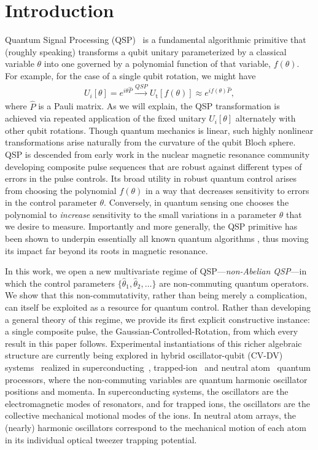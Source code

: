 \documentclass[aps,prx,showpacs,notitlepage,twocolumn,superscriptaddress,nofootinbib,preprintnumbers,floatfix,10pt, longbibliography]{revtex4-2}
\begin{document}
\section{Introduction}

Quantum Signal Processing (QSP)~\cite{low2017optimal,motlagh2023generalized} is a fundamental algorithmic primitive that (roughly speaking) transforms a qubit unitary parameterized by a classical variable $\theta$ into one governed by a polynomial function of that variable, $f(\theta)$.  For example, for the case of a single qubit rotation, we might have
\begin{align}
    U_i[\theta]=e^{i\theta \hat P}\xrightarrow{QSP} U_\mathrm{t}[f(\theta)]\approx e^{i f(\theta) \hat P},\label{eq:QSP1}
\end{align}
where $\hat P$ is a Pauli matrix.  As we will explain, the QSP transformation is achieved via repeated application of the fixed unitary $U_i[\theta]$ alternately with other qubit rotations.
Though quantum mechanics is linear, such highly nonlinear transformations arise naturally from the curvature of the qubit Bloch sphere. QSP is descended from early work in the nuclear magnetic resonance community developing composite pulse sequences that are robust against different types of errors in the pulse controls.   Its broad utility in robust quantum control arises from choosing the polynomial $f(\theta)$ in a way that decreases sensitivity to errors in the control parameter $\theta$. Conversely, in quantum sensing one chooses the polynomial to \emph{increase} sensitivity to the small variations in a parameter $\theta$ that we desire to measure. Importantly and more generally, the QSP primitive has been shown to underpin essentially all known quantum algorithms \cite{martyn2021grand}, thus moving its impact far beyond its roots in magnetic resonance.

In this work, we open a new multivariate regime of QSP---\emph{non-Abelian QSP}---in which the control parameters $\{\hat\theta_1, \hat\theta_2, \ldots\}$ are non-commuting quantum operators. We show that this non-commutativity, rather than being merely a complication, can itself be exploited as a resource for quantum control. Rather than developing a general theory of this regime, we provide its first explicit constructive instance: a single composite pulse, the Gaussian-Controlled-Rotation, from which every result in this paper follows.
Experimental instantiations of this richer algebraic structure are currently being explored in hybrid oscillator-qubit (CV-DV) systems~\cite{brenner2024factoring,ISA,braunstein2005quantum} realized in superconducting~\cite{eickbusch2022fast,haroche2013nobel}, trapped-ion~\cite{bruzewicz2019trapped,fluhmann2019encoding} and neutral atom~\cite{kumar2023quantum,garcia2019single} quantum processors, where the non-commuting variables are quantum harmonic oscillator positions and momenta.  In superconducting systems, the oscillators are the electromagnetic modes of resonators, and for trapped ions, the oscillators are the collective mechanical motional modes of the ions. In neutral atom arrays, the (nearly) harmonic oscillators correspond to the mechanical motion of each atom in its individual optical tweezer trapping potential.
\end{document}
